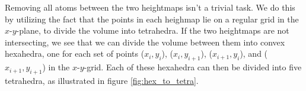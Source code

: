 Removing all atoms between the two heightmaps isn't a trivial task. We do this by utilizing the fact that the points in each heighmap lie on a regular grid in the $x$-$y$-plane, to divide the volume into tetrahedra. If the two heightmaps are not intersecting, we see that we can divide the volume between them into convex hexahedra, one for each set of points
($x_{i}, y_{i}$), ($x_{i}, y_{i+1}$), ($x_{i+1}, y_{i}$), and ($x_{i+1}, y_{i+1}$) 
in the $x$-$y$-grid. Each of these hexahedra can then be divided into five tetrahedra, as illustrated in figure \ref{fig:hex_to_tetra}.

% 

